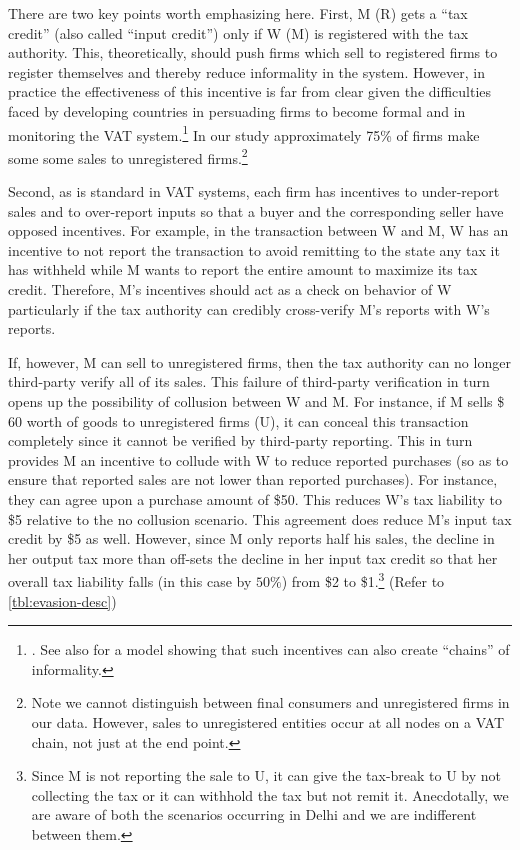 There are two key points worth emphasizing here. First, M (R) gets a ``tax credit'' (also called ``input credit'') only if W (M) is registered with the tax authority. This, theoretically, should push firms which sell to registered firms to register themselves and thereby reduce informality in the system. However, in practice the effectiveness of this incentive is far from clear given the difficulties faced by developing countries in persuading firms to become formal and in monitoring the VAT system.\footnote{\cite{bird2005value}. See also \cite{DePaulaScheinkman:2010} for a model showing that such incentives can also create ``chains'' of informality.} In our study
approximately 75\% of firms make some some sales to unregistered firms.\footnote{Note we cannot distinguish between final consumers and unregistered firms in our data. However, sales to unregistered entities occur at all nodes on a VAT chain, not just at the end point.}

Second, as is standard in VAT systems, each firm has incentives to under-report sales and to over-report inputs so that a buyer and the corresponding seller have opposed incentives. For example, in the transaction between W and M, W has an incentive to not report the transaction to avoid remitting to the state any tax it has withheld while M wants to report the entire amount to maximize its tax credit. Therefore, M's incentives should act as a check on behavior of W particularly if the tax authority can credibly cross-verify M's reports with W's reports. 

If, however, M can sell to unregistered firms, then the tax authority can no longer third-party verify all of its sales. This failure of third-party verification in turn opens up the possibility of collusion between W and M.  For instance, if M sells \$ 60 worth of goods to unregistered firms (U), it can conceal this transaction completely since it cannot be verified by third-party reporting. This in turn provides M an incentive to collude with W to reduce reported purchases (so as to ensure that reported sales are not lower than reported purchases). For instance, they can agree upon a purchase amount of \$50. This reduces W's tax liability to \$5 relative to the no collusion scenario. This agreement does reduce M's input tax credit by \$5 as well. However, since M only reports half his sales, the decline in her output tax more than off-sets the decline in her input tax credit so that her overall tax liability falls (in this case by $50\%$) from \$2 to \$1.\footnote{Since M is not reporting the sale to U, it can give the tax-break to U by not collecting the tax or it can withhold the tax but not remit it. Anecdotally, we are aware of both the scenarios occurring in Delhi and we are indifferent between them.} (Refer to \cref{tbl:evasion-desc})


